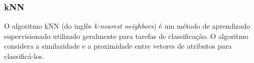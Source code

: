 \subsubsection{kNN}
O algoritmo kNN (do inglês \textit{k-nearest neighbors}) é um método de
aprendizado supervisionado utilizado geralmente para tarefas de classificação. O
algoritmo considera a similaridade e a proximidade entre vetores de atributos
para classificá-los.





